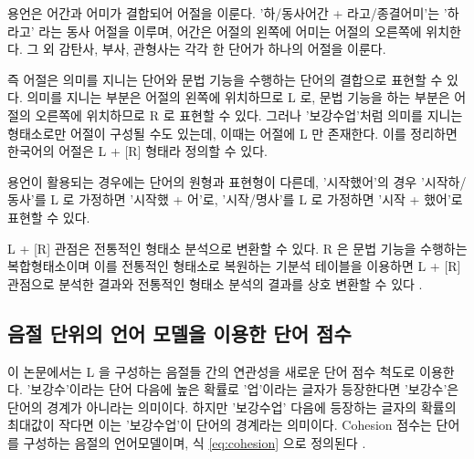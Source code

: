 \documentclass[oneside, ko,phd]{snuthesis_utf8_kor}
\begin{document}
\begin{table}[H]
\small
\centering
\caption{명사가 포함된 어절의 구조. (N: 명사, J: 조사, V: 동사, E: 어미, EP: 선어말어미, VCP: 동사형 전성어미)}
\label{tab:three_example_of_begin}
\end{table}

용언은 어간과 어미가 결합되어 어절을 이룬다.
'하/동사어간 + 라고/종결어미'는 '하라고' 라는 동사 어절을 이루며, 어간은 어절의 왼쪽에 어미는 어절의 오른쪽에 위치한다.
그 외 감탄사, 부사, 관형사는 각각 한 단어가 하나의 어절을 이룬다.

즉 어절은 의미를 지니는 단어와 문법 기능을 수행하는 단어의 결합으로 표현할 수 있다.
의미를 지니는 부분은 어절의 왼쪽에 위치하므로 L 로, 문법 기능을 하는 부분은 어절의 오른쪽에 위치하므로 R 로 표현할 수 있다.
그러나 '보강수업'처럼 의미를 지니는 형태소로만 어절이 구성될 수도 있는데, 이때는 어절에 L 만 존재한다.
이를 정리하면 한국어의 어절은 L + [R] 형태라 정의할 수 있다.

용언이 활용되는 경우에는 단어의 원형과 표현형이 다른데, '시작했어'의 경우 '시작하/동사'를 L 로 가정하면 '시작했 + 어'로, '시작/명사'를 L 로 가정하면 '시작 + 했어'로 표현할 수 있다.

L + [R] 관점은 전통적인 형태소 분석으로 변환할 수 있다.
R 은 문법 기능을 수행하는 복합형태소이며 이를 전통적인 형태소로 복원하는 기분석 테이블을 이용하면 L + [R] 관점으로 분석한 결과와 전통적인 형태소 분석의 결과를 상호 변환할 수 있다 \cite{shim2013syllable}.

\subsection{음절 단위의 언어 모델을 이용한 단어 점수}
이 논문에서는 L 을 구성하는 음절들 간의 연관성을 새로운 단어 점수 척도로 이용한다.
'보강수'이라는 단어 다음에 높은 확률로 '업'이라는 글자가 등장한다면 '보강수'은 단어의 경계가 아니라는 의미이다.
하지만 '보강수업' 다음에 등장하는 글자의 확률의 최대값이 작다면 이는 '보강수업'이 단어의 경계라는 의미이다.
Cohesion 점수는 단어를 구성하는 음절의 언어모델이며, 식 \ref{eq:cohesion} 으로 정의된다 \cite{kim2013cleansing}.
\end{document}
